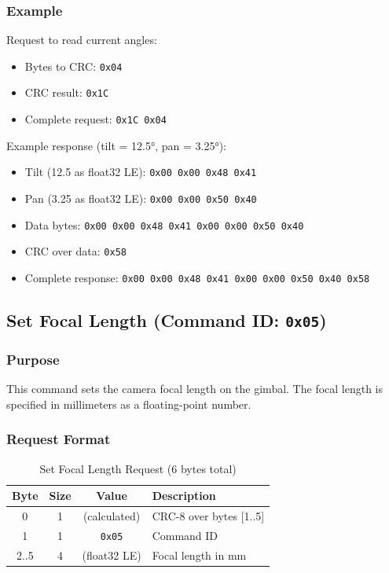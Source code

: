 \documentclass[12pt, titlepage]{article}
\begin{document}
\subsubsection{Example}

Request to read current angles:
\begin{itemize}
  \item Bytes to CRC: \texttt{0x04}
  \item CRC result: \texttt{0x1C}
  \item Complete request: \texttt{0x1C 0x04}
\end{itemize}

Example response (tilt = 12.5°, pan = 3.25°):
\begin{itemize}
  \item Tilt (12.5 as float32 LE): \texttt{0x00 0x00 0x48 0x41}
  \item Pan (3.25 as float32 LE): \texttt{0x00 0x00 0x50 0x40}
  \item Data bytes: \texttt{0x00 0x00 0x48 0x41 0x00 0x00 0x50 0x40}
  \item CRC over data: \texttt{0x58}
  \item Complete response: \texttt{0x00 0x00 0x48 0x41 0x00 0x00 0x50 0x40 0x58}
\end{itemize}

\subsection{Set Focal Length (Command ID: \texttt{0x05})}

\subsubsection{Purpose}
This command sets the camera focal length on the gimbal. The focal length is
specified in millimeters as a floating-point number.

\subsubsection{Request Format}

\begin{table}[H]
  \centering
  \begin{tabular}{cccl}
    \toprule
    \textbf{Byte} & \textbf{Size} & \textbf{Value} & \textbf{Description}    \\
    \midrule
    0             & 1             & (calculated)   & CRC-8 over bytes [1..5] \\
    1             & 1             & \texttt{0x05}  & Command ID              \\
    2..5          & 4             & (float32 LE)   & Focal length in mm      \\
    \bottomrule
  \end{tabular}
  \caption{Set Focal Length Request (6 bytes total)}
\end{table}
\end{document}

